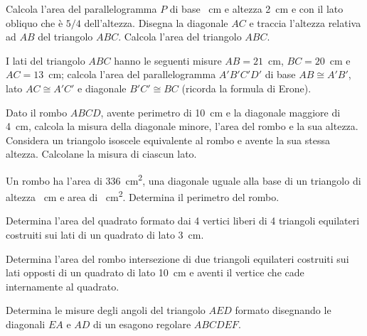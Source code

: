 \begin{multicols}{2}
\begin{esercizio}
\label{ese:7.49}
Calcola l'area del parallelogramma $P$ di base ~cm e altezza 2~cm e con il lato obliquo che è $5/4$ dell'altezza. Disegna la diagonale $AC$ e traccia l'altezza relativa ad $AB$ del triangolo $ABC$. Calcola l'area del triangolo $ABC$.
\end{esercizio}

\begin{esercizio}
\label{ese:7.50}
I lati del triangolo $ABC$ hanno le seguenti misure $AB=21$~cm, $BC=20$~cm e $AC=13$~cm; calcola l'area del parallelogramma $A'B'C'D'$ di base $AB\cong A'B'$, lato $AC\cong A'C'$ e diagonale $B'C'\cong BC$ (ricorda la formula di Erone).
\end{esercizio}

\begin{esercizio}
\label{ese:7.51}
Dato il rombo $ABCD$, avente perimetro di 10~cm e la diagonale maggiore di 4~cm, calcola la misura della diagonale minore, l'area del rombo e la sua altezza. Considera un triangolo isoscele equivalente al rombo e avente la sua stessa altezza. Calcolane la misura di ciascun lato.
\end{esercizio}

\begin{esercizio}
\label{ese:7.52}
Un rombo ha l'area di 336~cm\textsuperscript{2}, una diagonale uguale alla base di un triangolo di altezza ~cm e area di ~cm\textsuperscript{2}. Determina il perimetro del rombo.
\end{esercizio}

\begin{esercizio}
\label{ese:7.53}
Determina l'area del quadrato formato dai 4 vertici liberi di 4 triangoli equilateri costruiti sui lati di un quadrato di lato 3~cm.
\end{esercizio}

\begin{esercizio}
\label{ese:7.54}
Determina l'area del rombo intersezione di due triangoli equilateri costruiti sui lati opposti di un quadrato di lato 10~cm e aventi il vertice che cade internamente al quadrato.
\end{esercizio}

\begin{esercizio}
\label{ese:7.55}
Determina le misure degli angoli del triangolo $AED$ formato disegnando le diagonali $EA$ e $AD$ di un esagono regolare $ABCDEF$.
\end{esercizio}


\end{multicols}
